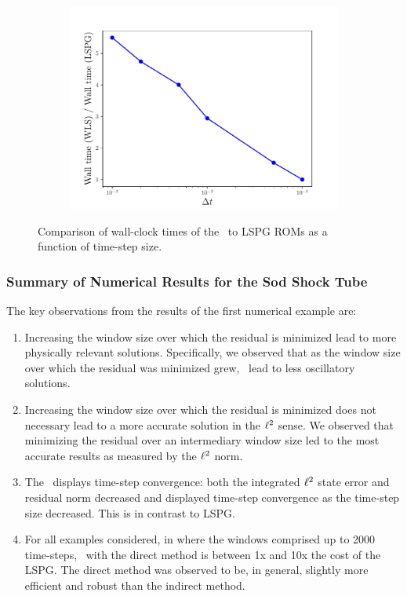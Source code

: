 \begin{figure}
\begin{center}
\begin{subfigure}[t]{0.45\textwidth}
\includegraphics[width=1.\linewidth]{figs/sod/walltime_vs_window_dtvar.pdf}
\label{fig:sod_error_a}
\end{subfigure}
\caption{Comparison of wall-clock times of the \methodAcronymROMs\ to LSPG ROMs as a function of time-step size.} 
\label{fig:walltime_dtvar}
\end{center}
\end{figure}


\subsubsection{Summary of Numerical Results for the Sod Shock Tube}
The key observations from the results of the first numerical example are: 
\begin{enumerate}
\item Increasing the window size over which the residual is minimized lead to more physically relevant solutions. Specifically, we observed that as the window size over which the residual was minimized grew, \methodAcronym\ lead to less oscillatory solutions.
\item Increasing the window size over which the residual is minimized does not necessary lead to a more accurate solution in the $\ell^2$ sense. We observed that minimizing the residual over an intermediary window size led to the most accurate results as measured by the $\ell^2$ norm.
\item The \methodAcronym\ displays time-step convergence: both the integrated $\ell^2$ state error and residual norm decreased and displayed time-step convergence as the time-step size decreased. This is in contrast to LSPG.
\item For all examples considered, in where the windows comprised up to 2000 time-steps, \methodAcronym\ with the direct method is between 1x and 10x the cost of the LSPG. The 
direct method was observed to be, in general, slightly more efficient and robust than the indirect method.
\end{enumerate} 


